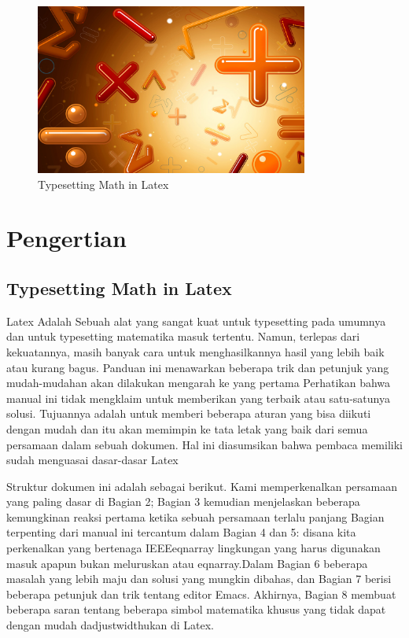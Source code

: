 \sloppy



\begin{figure}[ht]
	\centerline{\includegraphics[width=0.80\textwidth]{gambar/dapi1.jpg}}
	\caption{Typesetting Math in Latex}
	\label{Typesetting Math in Latex}
\end{figure}





\section {Pengertian }
\subsection {Typesetting Math in Latex}


 \hspace*{0.5in} Latex Adalah Sebuah alat yang sangat kuat untuk typesetting pada umumnya dan untuk typesetting matematika masuk tertentu. Namun, terlepas dari kekuatannya, masih banyak cara untuk menghasilkannya hasil yang lebih baik atau kurang bagus. Panduan ini menawarkan beberapa trik dan petunjuk yang mudah-mudahan akan dilakukan mengarah ke yang pertama Perhatikan bahwa manual ini tidak mengklaim untuk memberikan yang terbaik atau satu-satunya solusi. Tujuannya adalah untuk memberi beberapa aturan yang bisa diikuti dengan mudah dan itu akan memimpin ke tata letak yang baik dari semua persamaan dalam sebuah dokumen. Hal ini diasumsikan bahwa pembaca memiliki sudah menguasai dasar-dasar Latex \par
\noindent 
\hspace*{0.5in} Struktur dokumen ini adalah sebagai berikut. Kami memperkenalkan persamaan yang paling dasar di Bagian 2; Bagian 3 kemudian menjelaskan beberapa kemungkinan reaksi pertama ketika sebuah persamaan terlalu panjang Bagian terpenting dari manual ini tercantum dalam Bagian 4 dan 5: disana kita perkenalkan yang bertenaga IEEEeqnarray lingkungan yang harus digunakan masuk apapun bukan meluruskan atau eqnarray.Dalam Bagian 6 beberapa masalah yang lebih maju dan solusi yang mungkin dibahas, dan Bagian 7 berisi beberapa petunjuk dan trik tentang editor Emacs. Akhirnya, Bagian 8 membuat beberapa saran tentang beberapa simbol matematika khusus yang tidak dapat dengan mudah dadjustwidthukan di Latex. \par
\noindent 
\vspace{12pt}
\noindent 
\vspace{12pt}
\noindent 


